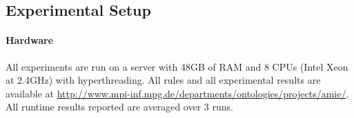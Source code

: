 

\subsection{Experimental Setup}\label{setup}

\paragraph{Hardware}
All experiments are run on a server with  48GB of RAM and 8 CPUs (Intel Xeon at 2.4GHz) with hyperthreading. 
All rules and all experimental results are available at \url{http://www.mpi-inf.mpg.de/departments/ontologies/projects/amie/}.
All runtime results reported are averaged over 3 runs.

